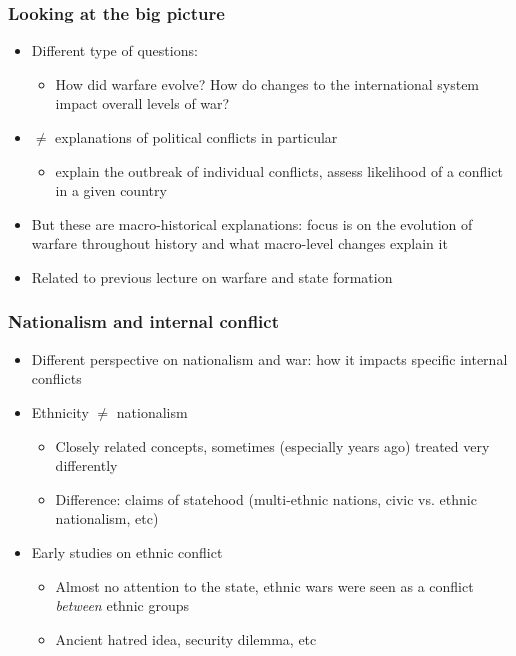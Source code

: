\documentclass[utf8, xcolor=dvipsnames]{beamer}
\begin{document}
\begin{frame}
\frametitle{Looking at the big picture}
\centering

\begin{itemize}
  \item Different type of questions:
  \begin{itemize}
    \item How did warfare evolve? How do changes to the international system impact overall levels of war?
  \end{itemize}
  \item $\neq$ explanations of political conflicts in particular
  \begin{itemize}
    \item explain the outbreak of individual conflicts, assess likelihood of a conflict in a given country
  \end{itemize}
  \item But these are macro-historical explanations: focus is on the evolution of warfare throughout history and what macro-level changes explain it
  \item Related to previous lecture on warfare and state formation
\end{itemize}

\end{frame}

\begin{frame}
\frametitle{Nationalism and internal conflict}
\centering

\begin{itemize}[<+->]
  \item Different perspective on nationalism and war: how it impacts specific internal conflicts
  \item Ethnicity $\neq$ nationalism
  \begin{itemize}
    \item Closely related concepts, sometimes (especially years ago) treated very differently
    \item Difference: claims of statehood (multi-ethnic nations, civic vs. ethnic nationalism, etc)
  \end{itemize}
  \item Early studies on ethnic conflict
  \begin{itemize}
    \item Almost no attention to the state, ethnic wars were seen as a conflict \textit{between} ethnic groups
    \item Ancient hatred idea, security dilemma, etc
  \end{itemize}
\end{itemize}

\end{frame}
\end{document}
